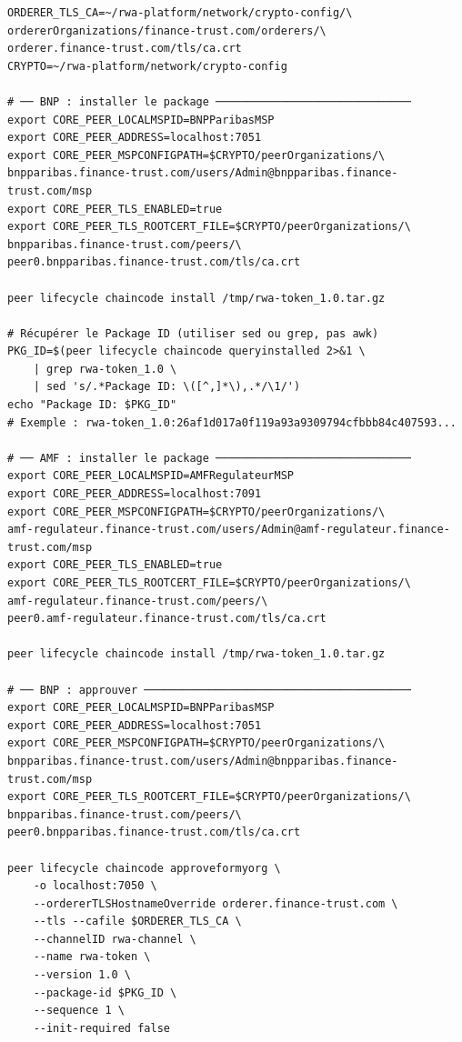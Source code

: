 \documentclass[12pt,a4paper,french]{article}
\begin{document}
\begin{lstlisting}[style=bash, caption={Lifecycle chaincode (version 1.0)}]
ORDERER_TLS_CA=~/rwa-platform/network/crypto-config/\
ordererOrganizations/finance-trust.com/orderers/\
orderer.finance-trust.com/tls/ca.crt
CRYPTO=~/rwa-platform/network/crypto-config

# ── BNP : installer le package ──────────────────────────────
export CORE_PEER_LOCALMSPID=BNPParibasMSP
export CORE_PEER_ADDRESS=localhost:7051
export CORE_PEER_MSPCONFIGPATH=$CRYPTO/peerOrganizations/\
bnpparibas.finance-trust.com/users/Admin@bnpparibas.finance-trust.com/msp
export CORE_PEER_TLS_ENABLED=true
export CORE_PEER_TLS_ROOTCERT_FILE=$CRYPTO/peerOrganizations/\
bnpparibas.finance-trust.com/peers/\
peer0.bnpparibas.finance-trust.com/tls/ca.crt

peer lifecycle chaincode install /tmp/rwa-token_1.0.tar.gz

# Récupérer le Package ID (utiliser sed ou grep, pas awk)
PKG_ID=$(peer lifecycle chaincode queryinstalled 2>&1 \
    | grep rwa-token_1.0 \
    | sed 's/.*Package ID: \([^,]*\),.*/\1/')
echo "Package ID: $PKG_ID"
# Exemple : rwa-token_1.0:26af1d017a0f119a93a9309794cfbbb84c407593...

# ── AMF : installer le package ──────────────────────────────
export CORE_PEER_LOCALMSPID=AMFRegulateurMSP
export CORE_PEER_ADDRESS=localhost:7091
export CORE_PEER_MSPCONFIGPATH=$CRYPTO/peerOrganizations/\
amf-regulateur.finance-trust.com/users/Admin@amf-regulateur.finance-trust.com/msp
export CORE_PEER_TLS_ENABLED=true
export CORE_PEER_TLS_ROOTCERT_FILE=$CRYPTO/peerOrganizations/\
amf-regulateur.finance-trust.com/peers/\
peer0.amf-regulateur.finance-trust.com/tls/ca.crt

peer lifecycle chaincode install /tmp/rwa-token_1.0.tar.gz

# ── BNP : approuver ─────────────────────────────────────────
export CORE_PEER_LOCALMSPID=BNPParibasMSP
export CORE_PEER_ADDRESS=localhost:7051
export CORE_PEER_MSPCONFIGPATH=$CRYPTO/peerOrganizations/\
bnpparibas.finance-trust.com/users/Admin@bnpparibas.finance-trust.com/msp
export CORE_PEER_TLS_ROOTCERT_FILE=$CRYPTO/peerOrganizations/\
bnpparibas.finance-trust.com/peers/\
peer0.bnpparibas.finance-trust.com/tls/ca.crt

peer lifecycle chaincode approveformyorg \
    -o localhost:7050 \
    --ordererTLSHostnameOverride orderer.finance-trust.com \
    --tls --cafile $ORDERER_TLS_CA \
    --channelID rwa-channel \
    --name rwa-token \
    --version 1.0 \
    --package-id $PKG_ID \
    --sequence 1 \
    --init-required false


\end{lstlisting}
\end{document}
